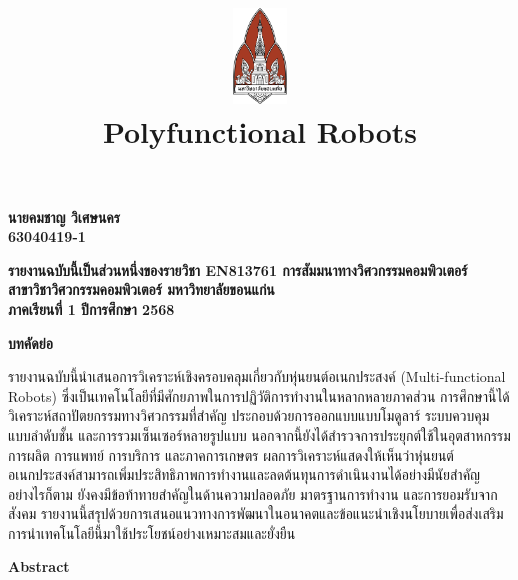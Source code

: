 \documentclass[a4paper]{article}
\date{}
\author{}
\title{
    \includegraphics[width=1in, height=1in, keepaspectratio]{logo.png}
    \\[2ex]
    {\fontsize{32pt}{36pt}\selectfont\textbf{Polyfunctional Robots}}
}
\begin{document}
\maketitle
\thispagestyle{empty}

\vfill
\begin{center}
    {\fontsize{22pt}{26pt}\selectfont\textbf{
        นายคมชาญ วิเศษนคร
        \\ 63040419-1
    }}
\end{center}
\vfill

\vfill
\begin{center}
    {\fontsize{16pt}{20pt}\selectfont\textbf{
        รายงานฉบับนี้เป็นส่วนหนึ่งของรายวิชา EN813761 การสัมมนาทางวิศวกรรมคอมพิวเตอร์
        \\ สาขาวิชาวิศวกรรมคอมพิวเตอร์ มหาวิทยาลัยขอนแก่น
        \\ ภาคเรียนที่ 1 ปีการศึกษา 2568
    }}
\end{center}

\newpage

\setcounter{page}{1}

\noindent
{\centering
    {\fontsize{18pt}{22pt}\selectfont\textbf{บทคัดย่อ}\par}
}

รายงานฉบับนี้นำเสนอการวิเคราะห์เชิงครอบคลุมเกี่ยวกับหุ่นยนต์อเนกประสงค์ (Multi-functional Robots) ซึ่งเป็นเทคโนโลยีที่มีศักยภาพในการปฏิวัติการทำงานในหลากหลายภาคส่วน การศึกษานี้ได้วิเคราะห์สถาปัตยกรรมทางวิศวกรรมที่สำคัญ ประกอบด้วยการออกแบบแบบโมดูลาร์ ระบบควบคุมแบบลำดับชั้น และการรวมเซ็นเซอร์หลายรูปแบบ นอกจากนี้ยังได้สำรวจการประยุกต์ใช้ในอุตสาหกรรมการผลิต การแพทย์ การบริการ และภาคการเกษตร ผลการวิเคราะห์แสดงให้เห็นว่าหุ่นยนต์อเนกประสงค์สามารถเพิ่มประสิทธิภาพการทำงานและลดต้นทุนการดำเนินงานได้อย่างมีนัยสำคัญ อย่างไรก็ตาม ยังคงมีข้อท้าทายสำคัญในด้านความปลอดภัย มาตรฐานการทำงาน และการยอมรับจากสังคม รายงานนี้สรุปด้วยการเสนอแนวทางการพัฒนาในอนาคตและข้อแนะนำเชิงนโยบายเพื่อส่งเสริมการนำเทคโนโลยีนี้มาใช้ประโยชน์อย่างเหมาะสมและยั่งยืน

\vspace{1em}

\noindent
{\centering
    {\fontsize{18pt}{22pt}\selectfont\textbf{Abstract}\par}
}
\end{document}
